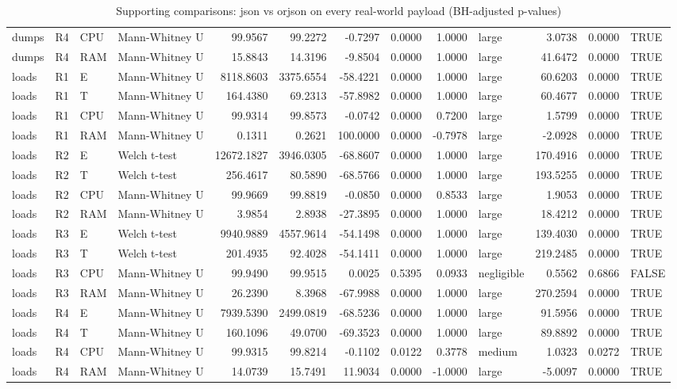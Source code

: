 \begin{table}[ht]
\begin{tabular}{llllrrrrrlrrl}
  dumps & R4 & CPU & Mann-Whitney U & 99.9567 & 99.2272 & -0.7297 & 0.0000 & 1.0000 & large & 3.0738 & 0.0000 & TRUE \\ 
  dumps & R4 & RAM & Mann-Whitney U & 15.8843 & 14.3196 & -9.8504 & 0.0000 & 1.0000 & large & 41.6472 & 0.0000 & TRUE \\ 
  loads & R1 & E & Mann-Whitney U & 8118.8603 & 3375.6554 & -58.4221 & 0.0000 & 1.0000 & large & 60.6203 & 0.0000 & TRUE \\ 
  loads & R1 & T & Mann-Whitney U & 164.4380 & 69.2313 & -57.8982 & 0.0000 & 1.0000 & large & 60.4677 & 0.0000 & TRUE \\ 
  loads & R1 & CPU & Mann-Whitney U & 99.9314 & 99.8573 & -0.0742 & 0.0000 & 0.7200 & large & 1.5799 & 0.0000 & TRUE \\ 
  loads & R1 & RAM & Mann-Whitney U & 0.1311 & 0.2621 & 100.0000 & 0.0000 & -0.7978 & large & -2.0928 & 0.0000 & TRUE \\ 
  loads & R2 & E & Welch t-test & 12672.1827 & 3946.0305 & -68.8607 & 0.0000 & 1.0000 & large & 170.4916 & 0.0000 & TRUE \\ 
  loads & R2 & T & Welch t-test & 256.4617 & 80.5890 & -68.5766 & 0.0000 & 1.0000 & large & 193.5255 & 0.0000 & TRUE \\ 
  loads & R2 & CPU & Mann-Whitney U & 99.9669 & 99.8819 & -0.0850 & 0.0000 & 0.8533 & large & 1.9053 & 0.0000 & TRUE \\ 
  loads & R2 & RAM & Mann-Whitney U & 3.9854 & 2.8938 & -27.3895 & 0.0000 & 1.0000 & large & 18.4212 & 0.0000 & TRUE \\ 
  loads & R3 & E & Welch t-test & 9940.9889 & 4557.9614 & -54.1498 & 0.0000 & 1.0000 & large & 139.4030 & 0.0000 & TRUE \\ 
  loads & R3 & T & Welch t-test & 201.4935 & 92.4028 & -54.1411 & 0.0000 & 1.0000 & large & 219.2485 & 0.0000 & TRUE \\ 
  loads & R3 & CPU & Mann-Whitney U & 99.9490 & 99.9515 & 0.0025 & 0.5395 & 0.0933 & negligible & 0.5562 & 0.6866 & FALSE \\ 
  loads & R3 & RAM & Mann-Whitney U & 26.2390 & 8.3968 & -67.9988 & 0.0000 & 1.0000 & large & 270.2594 & 0.0000 & TRUE \\ 
  loads & R4 & E & Mann-Whitney U & 7939.5390 & 2499.0819 & -68.5236 & 0.0000 & 1.0000 & large & 91.5956 & 0.0000 & TRUE \\ 
  loads & R4 & T & Mann-Whitney U & 160.1096 & 49.0700 & -69.3523 & 0.0000 & 1.0000 & large & 89.8892 & 0.0000 & TRUE \\ 
  loads & R4 & CPU & Mann-Whitney U & 99.9315 & 99.8214 & -0.1102 & 0.0122 & 0.3778 & medium & 1.0323 & 0.0272 & TRUE \\ 
  loads & R4 & RAM & Mann-Whitney U & 14.0739 & 15.7491 & 11.9034 & 0.0000 & -1.0000 & large & -5.0097 & 0.0000 & TRUE \\ 
   \bottomrule
\end{tabular}
\caption{Supporting comparisons: json vs orjson on every real-world payload (BH-adjusted p-values)} 
\label{tab:rq2_supporting}
\end{table}
